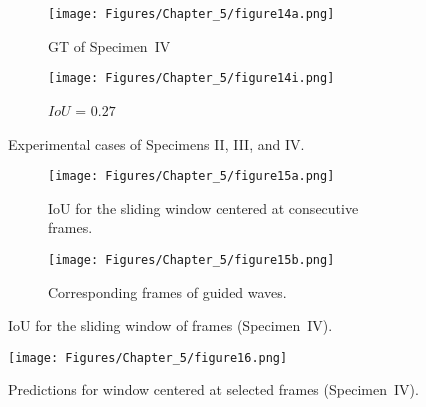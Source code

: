 \begin{figure} [!h]
\begin{subfigure}[b]{0.47\textwidth}
		\centering
		\texttt{[image: Figures/Chapter\_5/figure14a.png]}
		\caption{GT of Specimen~IV}
		\label{fig:gt_specimen_4}
	\end{subfigure}
	\hfill
	\begin{subfigure}[b]{0.47\textwidth}
		\centering
		\texttt{[image: Figures/Chapter\_5/figure14i.png]}
		\caption{\(IoU\) = \(0.27\)} 
		\label{fig:L3_S4_B_ijjeh}
	\end{subfigure}
	\caption{Experimental cases of Specimens II, III, and IV.}
	\label{fig:exp_case}
\end{figure} 
\begin{figure} [!h]
	\centering
	\begin{subfigure}[b]{1\textwidth}
		\centering
		\texttt{[image: Figures/Chapter\_5/figure15a.png]}
		\caption{IoU for the sliding window centered at consecutive frames.}
		\label{fig:L3_S4_B_333x333p_50kHz_5HC_IoU}
	\end{subfigure}
	\par\medskip
	\begin{subfigure}[b]{1\textwidth}
		\centering
		\texttt{[image: Figures/Chapter\_5/figure15b.png]}
		\caption{Corresponding frames of guided waves.} 
		\label{fig:L3_S4_B_333x333p_50kHz_5HC_shapes_}
	\end{subfigure}
	\caption{IoU for the sliding window of frames (Specimen~IV).}
	\label{fig:L3_S4_B_333x333p_50kHz_5HC_IoU_centre_window}
\end{figure} 
\begin{figure}[!h]
	\centering
	\texttt{[image: Figures/Chapter\_5/figure16.png]}
	\caption{Predictions for window centered at selected frames (Specimen~IV).}
	\label{fig:L3_S4_B_5HC_predictions}
\end{figure}


